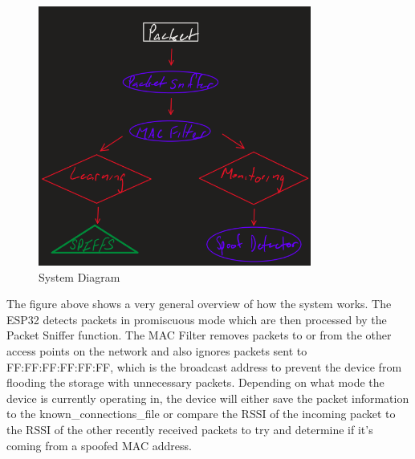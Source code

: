\documentclass[letterpaper, 11pt]{article}
\begin{document}
\begin{figure}[H] %
    \centering
    \includegraphics[width=0.8\textwidth]{Diagram.png}
    \caption{System Diagram}
    \label{fig:SystemDiagram}
\end{figure}

The figure above shows a very general overview of how the system works. The ESP32 detects packets in promiscuous mode which are then processed by the Packet Sniffer function. The MAC 
Filter removes packets to or from the other access points on the network and also ignores packets sent to FF:FF:FF:FF:FF:FF, which is the broadcast address to prevent the device from
flooding the storage with unnecessary packets. Depending on what mode the device is currently operating in, the device will either save the packet information to the known\_connections\_file 
or compare the RSSI of the incoming packet to the RSSI of the other recently received packets to try and determine if it's coming from a spoofed MAC address.
\end{document}
